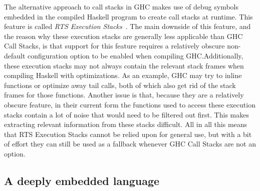 \documentclass[fontsize=11pt,a4paper,parskip=half,numbers=noenddot]{scrartcl}
\begin{document}

The alternative approach to call stacks in GHC makes use of debug symbols
embedded in the compiled Haskell program to create call stacks at runtime. This
feature is called \emph{RTS Execution Stacks}~\cite{ghc-dwarf-execution-stacks}.
The main downside of this feature, and the reason why these execution stacks are
generally less applicable than GHC Call Stacks, is that support for this feature
requires a relatively obscure non-default configuration option to be enabled
when compiling GHC.\@ Additionally, these execution stacks may not always
contain the relevant stack frames when compiling Haskell with optimizations. As
an example, GHC may try to inline functions or optimize away tail calls, both of
which also get rid of the stack frames for those functions. Another issue is
that, because they are a relatively obscure feature, in their current form the
functions used to access these execution stacks contain a lot of noise that
would need to be filtered out first. This makes extracting relevant information
from these stacks difficult. All in all this means that RTS Execution Stacks
cannot be relied upon for general use, but with a bit of effort they can still
be used as a fallback whenever GHC Call Stacks are not an option.

\subsection{A deeply embedded language}\label{sec:language}

\end{document}
